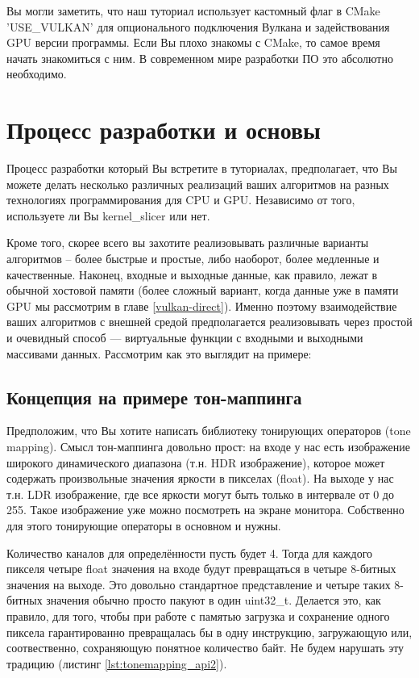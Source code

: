 \documentclass[11pt,fleqn,english,russian]{report} %
\begin{document}
\begin{remark} 
Вы могли заметить, что наш туториал использует кастомный флаг в CMake 'USE\_VULKAN' для опционального подключения Вулкана и задействования GPU версии программы. Если Вы плохо знакомы с CMake, то самое время начать знакомиться с ним. В современном мире разработки ПО это абсолютно необходимо. 
\end{remark}

\chapter{Процесс разработки и основы}

Процесс разработки который Вы встретите в туториалах, предполагает, что Вы можете делать несколько различных реализаций ваших алгоритмов на разных технологиях программирования для CPU и GPU. Независимо от того, используете ли Вы kernel\_slicer или нет. 

Кроме того, скорее всего вы захотите реализовывать различные варианты алгоритмов -- более быстрые и простые, либо наоборот, более медленные и качественные. Наконец, входные и выходные данные, как правило, лежат в обычной хостовой памяти (более сложный вариант, когда данные уже в памяти GPU мы рассмотрим в главе \ref{vulkan-direct}). Именно поэтому взаимодействие ваших алгоритмов с внешней средой предполагается реализовывать через простой и очевидный способ --- виртуальные функции с входными и выходными массивами данных. Рассмотрим как это выглядит на примере: 

\section{Концепция на примере тон-маппинга}

Предположим, что Вы хотите написать библиотеку тонирующих операторов (tone mapping). Смысл тон-маппинга довольно прост: на входе у нас есть изображение широкого динамического диапазона (т.н. HDR изображение), которое может содержать произвольные значения яркости в пикселах (float). На выходе у нас т.н. LDR изображение, где все яркости могут быть только в интервале от 0 до 255. Такое изображение уже можно посмотреть на экране монитора. Собственно для этого тонирующие операторы в основном и нужны.

Количество каналов для определённости пусть будет 4. Тогда для каждого пикселя четыре float значения на входе будут превращаться в четыре 8-битных значения на выходе. Это довольно стандартное представление и четыре таких 8-битных значения обычно просто пакуют в один uint32\_t. Делается это, как правило, для того, чтобы при работе с памятью загрузка и сохранение одного пиксела гарантированно превращалась бы в одну инструкцию, загружающую или, соотвественно, сохраняющую понятное количество байт. Не будем нарушать эту традицию (листинг \ref{lst:tonemapping_api2}).
\end{document}
